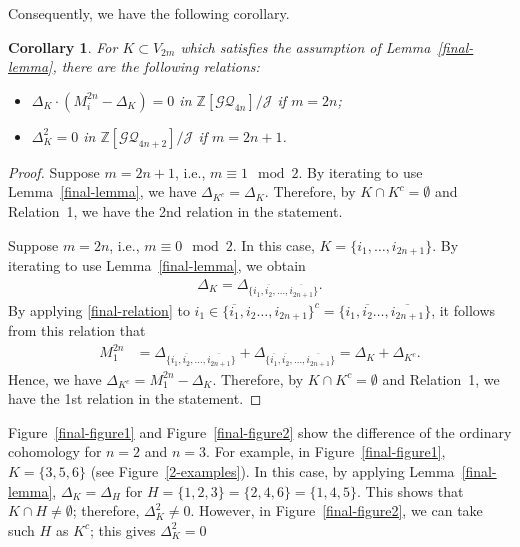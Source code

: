 \documentclass[12pt]{amsart}
\newtheorem{corollary}[theorem]{Corollary}
\theoremstyle{remark}
\numberwithin{equation}{section}
\begin{document}
Consequently, we have the following corollary.
\begin{corollary}
\label{final-cor}
For $K\subset V_{2m}$ which satisfies the assumption of Lemma~\ref{final-lemma}, 
 there are the following relations:
\begin{itemize}
\item $\Delta_{K}\cdot (M_{i}^{2n}-\Delta_{K})=0$ in $\mathbb{Z}[\mathcal{GQ}_{4n}]/\mathcal{J}$ if $m=2n$;
\item $\Delta_{K}^{2}=0$ in $\mathbb{Z}[\mathcal{GQ}_{4n+2}]/\mathcal{J}$ if $m=2n+1$.
\end{itemize}
\end{corollary}
\begin{proof}
Suppose $m=2n+1$, i.e., $m\equiv 1 \mod 2$. 
By iterating to use Lemma~\ref{final-lemma}, we have $\Delta_{K^{c}}=\Delta_{K}$.
Therefore, by $K\cap K^{c}=\emptyset$ and   
Relation~1, we have the 2nd relation in the statement. 

Suppose $m=2n$, i.e., $m\equiv 0 \mod 2$. 
In this case, $K=\{i_{1},\ldots, i_{2n+1}\}$.
By iterating to use Lemma~\ref{final-lemma}, we obtain  
\begin{align*}
\Delta_{K}=\Delta_{\{i_{1},\overline{i_{2}}, \ldots, \overline{i_{2n+1}}\}}.
\end{align*}
By applying \eqref{final-relation} to $i_{1}\in \{\overline{i_{1}},i_{2}\ldots, i_{2n+1}\}^{c}=\{i_{1},\overline{i_{2}}\ldots, \overline{i_{2n+1}}\}$, it follows from this relation that 
\begin{align*}
M_{1}^{2n}&=
\Delta_{\{i_{1},\overline{i_{2}}, \ldots, \overline{i_{2n+1}}\}}+\Delta_{\{\overline{i_{1}},\overline{i_{2}}, \ldots, \overline{i_{2n+1}}\}}=\Delta_{K}+\Delta_{K^{c}}.
\end{align*}
Hence, we have $\Delta_{K^{c}}=M_{1}^{2n}-\Delta_{K}$. 
Therefore, by $K\cap K^{c}=\emptyset$ and Relation~1, we have the 1st relation in the statement. 
\end{proof}

Figure~\ref{final-figure1} and Figure~\ref{final-figure2} show the difference of the ordinary cohomology for $n=2$ and $n=3$.
For example, in Figure~\ref{final-figure1}, $K=\{3,5,6\}$ (see Figure~\ref{2-examples}).
In this case, by applying Lemma~\ref{final-lemma}, $\Delta_{K}=\Delta_{H}$ for $H=\{1,2,3\}=\{2,4,6\}=\{1,4,5\}$.
This shows that $K\cap H\not=\emptyset$; therefore, $\Delta_{K}^{2}\not=0$.
However, in Figure~\ref{final-figure2}, we can take such $H$ as $K^{c}$; this gives $\Delta_{K}^{2}=0$
\end{document}
